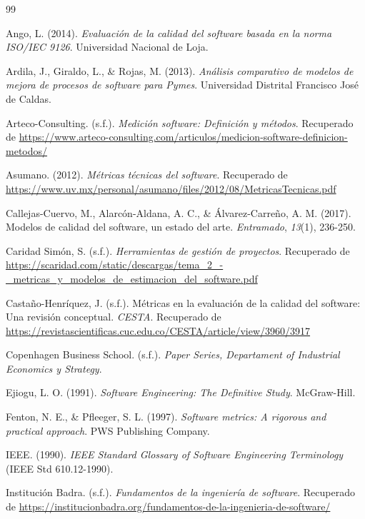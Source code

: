 \documentclass[11pt]{article}
\begin{document}
\begin{thebibliography}{99}

 Ango, L. (2014). \textit{Evaluación de la calidad del software basada en la norma ISO/IEC 9126}. Universidad Nacional de Loja.

 Ardila, J., Giraldo, L., \& Rojas, M. (2013). \textit{Análisis comparativo de modelos de mejora de procesos de software para Pymes}. Universidad Distrital Francisco José de Caldas.

 Arteco-Consulting. (s.f.). \textit{Medición software: Definición y métodos}. Recuperado de \url{https://www.arteco-consulting.com/articulos/medicion-software-definicion-metodos/}

 Asumano. (2012). \textit{Métricas técnicas del software}. Recuperado de \url{https://www.uv.mx/personal/asumano/files/2012/08/MetricasTecnicas.pdf}

 Callejas-Cuervo, M., Alarcón-Aldana, A. C., \& Álvarez-Carreño, A. M. (2017). Modelos de calidad del software, un estado del arte. \textit{Entramado}, \textit{13}(1), 236-250.

 Caridad Simón, S. (s.f.). \textit{Herramientas de gestión de proyectos}. Recuperado de \url{https://scaridad.com/static/descargas/tema_2_-_metricas_y_modelos_de_estimacion_del_software.pdf}

 Castaño-Henríquez, J. (s.f.). Métricas en la evaluación de la calidad del software: Una revisión conceptual. \textit{CESTA}. Recuperado de \url{https://revistascientificas.cuc.edu.co/CESTA/article/view/3960/3917}

 Copenhagen Business School. (s.f.). \textit{Paper Series, Departament of Industrial Economics y Strategy}.

 Ejiogu, L. O. (1991). \textit{Software Engineering: The Definitive Study}. McGraw-Hill.

 Fenton, N. E., \& Pfleeger, S. L. (1997). \textit{Software metrics: A rigorous and practical approach}. PWS Publishing Company.

 IEEE. (1990). \textit{IEEE Standard Glossary of Software Engineering Terminology} (IEEE Std 610.12-1990).

 Institución Badra. (s.f.). \textit{Fundamentos de la ingeniería de software}. Recuperado de \url{https://institucionbadra.org/fundamentos-de-la-ingenieria-de-software/}


\end{thebibliography}
\end{document}
